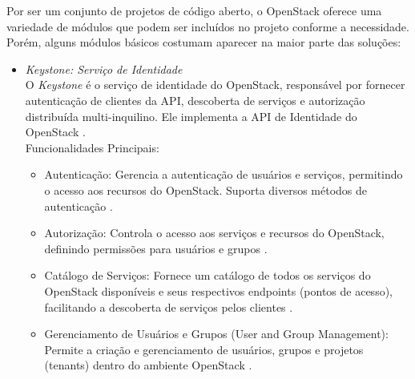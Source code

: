 \begin{itemize}
Por ser um conjunto de projetos de código aberto, o OpenStack oferece uma variedade de módulos que podem ser incluídos no projeto conforme a necessidade. Porém, alguns módulos básicos costumam aparecer na maior parte das soluções:

\begin{itemize}
    \item \emph{Keystone: Serviço de Identidade}\\
    O \textit{Keystone} é o serviço de identidade do OpenStack, responsável por fornecer autenticação de clientes da API, descoberta de serviços e autorização distribuída multi-inquilino. Ele implementa a API de Identidade do OpenStack \cite{openstackkeystone}.\\
    Funcionalidades Principais:
    \begin{itemize}
        \item Autenticação: Gerencia a autenticação de usuários e serviços, permitindo o acesso aos recursos do OpenStack. Suporta diversos métodos de autenticação \cite{openstackkeystone}.
        \item Autorização: Controla o acesso aos serviços e recursos do OpenStack, definindo permissões para usuários e grupos \cite{openstackkeystone}.
        \item Catálogo de Serviços: Fornece um catálogo de todos os serviços do OpenStack disponíveis e seus respectivos endpoints (pontos de acesso), facilitando a descoberta de serviços pelos clientes \cite{openstackkeystone}.
        \item Gerenciamento de Usuários e Grupos (User and Group Management): Permite a criação e gerenciamento de usuários, grupos e projetos (tenants) dentro do ambiente OpenStack \cite{openstackkeystone}.
    \end{itemize}


\end{itemize}
\end{itemize}
